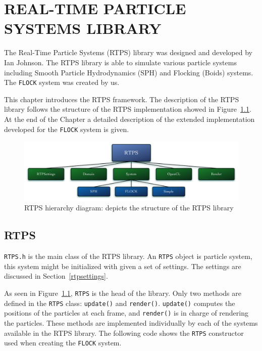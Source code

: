 \chapter{REAL-TIME PARTICLE SYSTEMS LIBRARY}\label{RTPSchapter}

The Real-Time Particle Systems (RTPS) library was designed and developed by Ian Johnson\cite{ianPaper}. The RTPS library is able to simulate various particle systems including Smooth Particle Hydrodynamics (SPH) and Flocking (Boids) systems. The \texttt{FLOCK} system was created by us.

This chapter introduces the RTPS framework. The description of the RTPS library follows the structure of the RTPS implementation showed in Figure~\ref{RTPSdiagram}. At the end of the Chapter a detailed description of the extended implementation developed for the \texttt{FLOCK} system is given. 

\begin{figure}[htbp]
\begin{center}
\includegraphics[scale=0.30]{figures/RTPSdiagramMyrna.pdf}
\caption{RTPS hierarchy diagram: depicts the structure of the RTPS library}
\label{RTPSdiagram}
\end{center}
\end{figure}

\section{RTPS}\label{rtpssection}
\texttt{RTPS.h} is the main class of the RTPS library. An \texttt{RTPS} object is particle system, this system might be initialized with given a set of settings. The settings are discussed in Section~\ref{rtpsettings}. 

As seen in Figure~\ref{RTPSdiagram}, \texttt{RTPS} is the head of the library. Only two methods are defined in the \texttt{RTPS} class: \texttt{update()} and \texttt{render()}. \texttt{update()} computes the positions of the particles at each frame, and \texttt{render()} is in charge of rendering the particles. These methods are implemented individually by each of the systems available in the RTPS library. The following code shows the \texttt{RTPS} constructor used when creating the \texttt{FLOCK} system.

